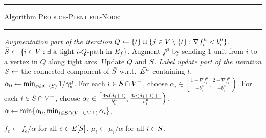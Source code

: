 \begin{multicols}{3}
\goodbreak
\medskip\hrule
Algorithm \textsc{Produce-Plentiful-Node}:
\smallskip\hrule\smallskip
\begin{algorithmic}[1]
            \State \emph{Augmentation part of the iteration}
            \State $Q \gets \{ t \} \cup \{ j \in V \setminus \{t\} : \nabla f^\mu_{i}<b_i^\mu \}$. \label{alg:Qdef}
            \State $\bar{S} \gets \{ i \in V: \exists \text{ a tight $i$-$Q$-path in } E_f \}$.			
		\State Augment $f^\mu$ by sending $1$ unit from $i$ to
                a vertex in $Q$ along tight arcs. \label{alg:aug} 
		\State Update $Q$ and $\bar{S}$.
            \EndWhile \vspace{.3cm}
            \State \emph{Label update part of the iteration}\label{alg:rescale}
            \State $S \gets$ the connected component of $\bar{S}$ w.r.t.\ $\accentset{\leftrightarrow}{E^\mu}$ containing $t$. \label{alg:Scomp}
            \State $\alpha_0 \gets \min_{e \in \delta^-(S)} 1/\gamma_e^\mu$. \label{alg:alpha0}
	    \State For each $i \in S \cap V^-$, choose
                $\alpha_i \in \left[ \frac{1 - \nabla f_i^\mu}{-b^\mu_i}, 
                    \frac{2 - \nabla f_i^\mu}{-b^\mu_i}\right)$. \label{alg:bigexcess}
            \State For each $i \in S \cap V^+$, choose $\alpha_i \in
                \left[\frac{3n(d_{i}+1)}{b^\mu_i},
                \frac{3n(d_{i}+1)+1}{b^\mu_i} \right)$. \label{alg:newplentiful}
            \State $\alpha \gets \min\{\alpha_0, \min_{i
                         \in S \cap (V^- \cup V^+)}\alpha_i\}$. 
            
            
	    \State $f_e \gets f_e / \alpha$ for all $e \in E[S]$. \label{alg:frescale}
	    \State $\mu_i \gets \mu_i / \alpha$ for all $i \in S$. \label{alg:muupdate}
	\EndWhile
	\State {}
    \end{algorithmic}


\end{multicols}
